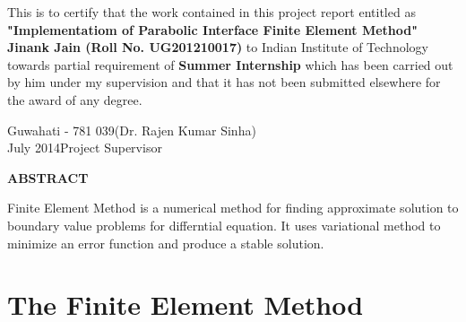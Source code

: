 \documentclass{report}
\begin{document}
 \begin{flushleft}
 This is to certify that the work contained in this project report entitled as \textbf{"Implementatiom of Parabolic Interface Finite Element Method"} \textbf{Jinank Jain (Roll No. UG201210017)} to Indian Institute of Technology towards partial requirement of \textbf{Summer Internship} which has been carried out by him under my supervision and that it has not been submitted elsewhere for the award of any degree.\\
 \end{flushleft}
 \bigskip \bigskip \bigskip \bigskip \bigskip
 
\noindent Guwahati - 781 039\hfill \hfill (Dr. Rajen Kumar Sinha)\\
\noindent July 2014\hfill \hfill Project Supervisor\\

\newpage
\begin{center}
 {\textbf{ \Large ABSTRACT\\ \bigskip}}
\end{center}
\begin{flushleft}
Finite Element Method is a numerical method for finding approximate solution to boundary value problems for differntial equation. It uses variational method to minimize an error function and produce a stable solution.
\end{flushleft}


\tableofcontents
\chapter{The Finite Element Method}
\end{document}
